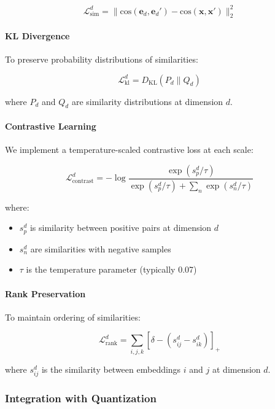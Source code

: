 \begin{equation}
    \mathcal{L}_{\text{sim}}^d = \|\text{cos}(\mathbf{e}_d, \mathbf{e}_d') - \text{cos}(\mathbf{x}, \mathbf{x}')\|_2^2
\end{equation}

\paragraph{KL Divergence}
To preserve probability distributions of similarities:

\begin{equation}
    \mathcal{L}_{\text{kl}}^d = D_{\text{KL}}(P_d \| Q_d)
\end{equation}

where $P_d$ and $Q_d$ are similarity distributions at dimension $d$.

\paragraph{Contrastive Learning}
We implement a temperature-scaled contrastive loss at each scale:

\begin{equation}
    \mathcal{L}_{\text{contrast}}^d = -\log\frac{\exp(s_p^d/\tau)}{\exp(s_p^d/\tau) + \sum_{n}\exp(s_n^d/\tau)}
\end{equation}

where:
\begin{itemize}
    \item $s_p^d$ is similarity between positive pairs at dimension $d$
    \item $s_n^d$ are similarities with negative samples
    \item $\tau$ is the temperature parameter (typically 0.07)
\end{itemize}

\paragraph{Rank Preservation}
To maintain ordering of similarities:

\begin{equation}
    \mathcal{L}_{\text{rank}}^d = \sum_{i,j,k} [\delta - (s_{ij}^d - s_{ik}^d)]_+
\end{equation}

where $s_{ij}^d$ is the similarity between embeddings $i$ and $j$ at dimension $d$.

\subsubsection{Integration with Quantization}

